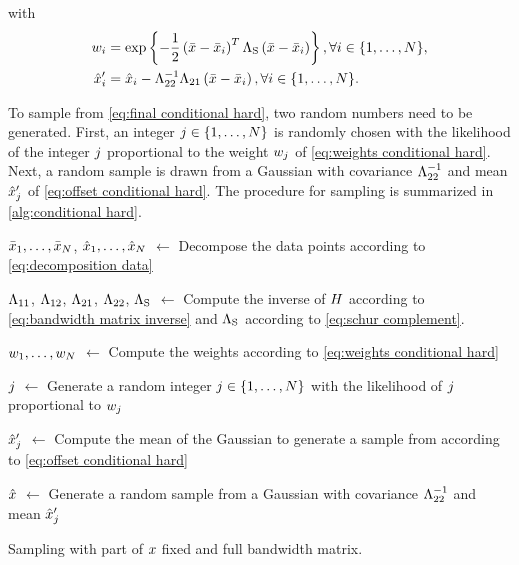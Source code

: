 with
\begin{align}
	\label{eq:weights conditional hard}
	w_{i} &= \exp\left\{ 
		-\frac{1}{2} \left(\bar{x} - \bar{x}_{i}\right)^T 
		\Lambda_{\mathrm{S}}
		\left(\bar{x} - \bar{x}_{i}\right) \right\},
	\forall i \in \{1,\ldots,N\}, \\
	\label{eq:offset conditional hard}
	\hat{x}_{i}' &= \hat{x}_{i} - \Lambda_{22}^{-1}\Lambda_{21} \left(\bar{x} - \bar{x}_{i} \right),
	\forall i \in \{1,\ldots,N\}.
\end{align}

To sample from \cref{eq:final conditional hard}, two random numbers need to be generated. 
First, an integer $j\in\{1,\ldots,N\}$ is randomly chosen with the likelihood of the integer $j$ proportional to the weight $w_{j}$ of \cref{eq:weights conditional hard}. 
Next, a random sample is drawn from a Gaussian with covariance $\Lambda_{22}^{-1}$ and mean $\hat{x}_{j}'$ of \cref{eq:offset conditional hard}.
The procedure for sampling is summarized in \cref{alg:conditional hard}.


\begin{algorithm}[t]
	
	$\bar{x}_{1},\ldots,\bar{x}_{N}$, $\hat{x}_{1},\ldots,\hat{x}_{N}$ $\gets$ Decompose the data points according to \cref{eq:decomposition data}
	
	$\Lambda_{11}$, $\Lambda_{12}$, $\Lambda_{21}$, $\Lambda_{22}$, $\Lambda_{\mathrm{S}}$ $\gets$ Compute the inverse of $H$ according to \cref{eq:bandwidth matrix inverse} and $\Lambda_{\mathrm{S}}$ according to \cref{eq:schur complement}.
	
	$w_{1},\ldots,w_{N}$ $\gets$ Compute the weights according to \cref{eq:weights conditional hard}
	
	$j$ $\gets$ Generate a random integer $j\in\{1,\ldots,N\}$ with the likelihood of $j$ proportional to $w_{j}$
	
	$\hat{x}_{j}'$ $\gets$ Compute the mean of the Gaussian to generate a sample from according to \cref{eq:offset conditional hard}
	
	$\hat{x}$ $\gets$ Generate a random sample from a Gaussian with covariance $\Lambda_{22}^{-1}$ and mean $\hat{x}_{j}'$
		
	\caption{Sampling with part of $x$ fixed and full bandwidth matrix.}
	\label{alg:conditional hard}
\end{algorithm}



